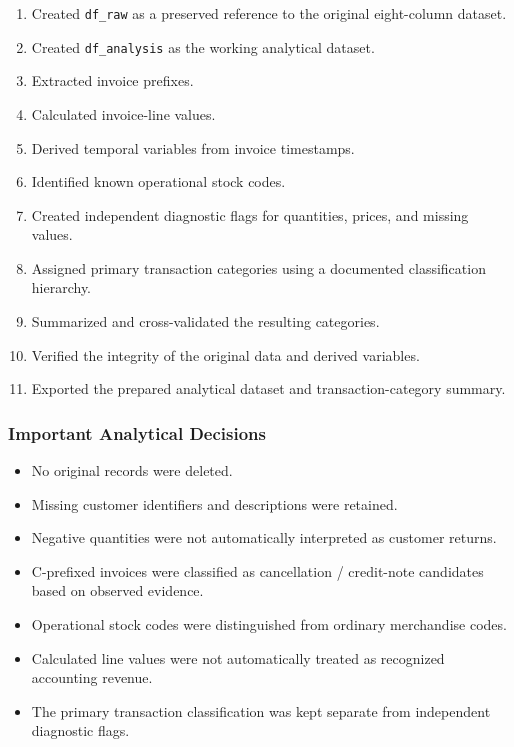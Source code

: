 \documentclass[11pt]{article}
\providecommand{\tightlist}{%
      \setlength{\itemsep}{0pt}\setlength{\parskip}{0pt}}
\begin{document}
\begin{enumerate}
\def\labelenumi{\arabic{enumi}.}
\tightlist
\item
  Created \texttt{df\_raw} as a preserved reference to the original
  eight-column dataset.
\item
  Created \texttt{df\_analysis} as the working analytical dataset.
\item
  Extracted invoice prefixes.
\item
  Calculated invoice-line values.
\item
  Derived temporal variables from invoice timestamps.
\item
  Identified known operational stock codes.
\item
  Created independent diagnostic flags for quantities, prices, and
  missing values.
\item
  Assigned primary transaction categories using a documented
  classification hierarchy.
\item
  Summarized and cross-validated the resulting categories.
\item
  Verified the integrity of the original data and derived variables.
\item
  Exported the prepared analytical dataset and transaction-category
  summary.
\end{enumerate}

\subsubsection{Important Analytical
Decisions}\label{important-analytical-decisions}

\begin{itemize}
\tightlist
\item
  No original records were deleted.
\item
  Missing customer identifiers and descriptions were retained.
\item
  Negative quantities were not automatically interpreted as customer
  returns.
\item
  C-prefixed invoices were classified as cancellation / credit-note
  candidates based on observed evidence.
\item
  Operational stock codes were distinguished from ordinary merchandise
  codes.
\item
  Calculated line values were not automatically treated as recognized
  accounting revenue.
\item
  The primary transaction classification was kept separate from
  independent diagnostic flags.
\end{itemize}
\end{document}
